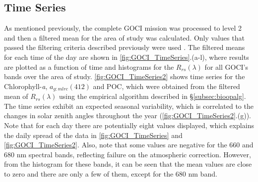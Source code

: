 \documentclass[onecolumn,3p,letterpaper,11pt]{elsarticle}
\begin{document}
\subsection{Time Series}
As mentioned previously, the complete GOCI mission was processed to level 2 and then a filtered mean for the area of study was calculated. Only values that passed the filtering criteria described previously were used \citep{Bailey2006}. The filtered means for each time of the day are shown in \autoref{fig:GOCI_TimeSeries}.(a-l), where results are plotted as a function of time and histograms for the $R_{rs}(\lambda)$ for all GOCI's bands over the area of study. \autoref{fig:GOCI_TimeSeries2} shows time series for the Chlorophyll-{\it a}, $a_{g:mlrc}(412)$ and POC, which were obtained from the filtered mean of $R_{rs}(\lambda)$ using the empirical algorithm described in \S\ref{subsec:bioopalg}. The time series exhibit an expected seasonal variability, which is correlated to the changes in solar zenith angles throughout the year (\autoref{fig:GOCI_TimeSeries2}.(g)). Note that for each day there are potentially eight values displayed, which explains the daily spread of the data in \autoref{fig:GOCI_TimeSeries} and \autoref{fig:GOCI_TimeSeries2}. Also, note that some values are negative for the 660 and 680 nm spectral bands, reflecting failure on the atmospheric correction. However, from the histogram for these bands, it can be seen that the mean values are close to zero and there are only a few of them, except for the 680 nm band.
\end{document}
